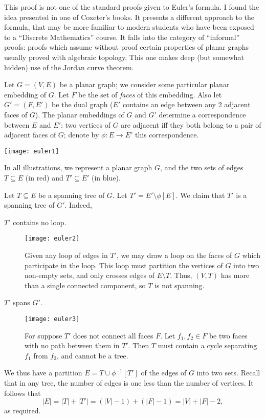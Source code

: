 \documentclass[12pt]{article}
\begin{document}
This proof is not one of the standard proofs given to Euler's formula.  I found the idea presented in one of Coxeter's books.  It presents a different approach to the formula, that may be more familiar to modern students who have been exposed to a ``Discrete Mathematics'' course.  It falls into the category of ``informal'' proofs: proofs which assume without proof certain properties of planar graphs usually proved with algebraic topology.  This one makes deep (but somewhat hidden) use of the Jordan curve theorem.

Let $G=(V,E)$ be a planar graph; we consider some particular planar embedding of $G$.  Let $F$ be the set of \emph{faces} of this embedding.  Also let $G'=(F,E')$ be the dual graph ($E'$ contains an edge between any 2 adjacent faces of $G$).  The planar embeddings of $G$ and $G'$ determine a correspondence between $E$ and $E'$: two vertices of $G$ are adjacent iff they both belong to a pair of adjacent faces of $G$; denote by $\phi:E\to E'$ this correspondence.

\begin{center}
\texttt{[image: euler1]}
\end{center}

\begin{small}
In all illustrations, we represent a planar graph $G$, and the two sets of edges $T\subseteq E$ (in red) and $T'\subseteq E'$ (in blue).
\end{small}

Let $T\subseteq E$ be a spanning tree of $G$.  Let $T' = E' \setminus \phi[E]$.  We claim that $T'$ is a spanning tree of $G'$.  Indeed,
\begin{description}
\item[$T'$ contains no loop.]
\begin{center}
\texttt{[image: euler2]}
\end{center}
Given any loop of edges in $T'$, we may draw a loop on the faces of $G$ which participate in the loop.  This loop must partition the vertices of $G$ into two non-empty sets, and only crosses edges of $E\setminus T$.  Thus, $(V,T)$ has more than a single connected component, so $T$ is not spanning.
\begin{small}
\end{small}

\item[$T'$ spans $G'$.]
\begin{center}
\texttt{[image: euler3]}
\end{center}
For suppose $T'$ does not connect all faces $F$.  Let $f_1,f_2\in F$ be two faces with no path between them in $T'$.  Then $T$ must contain a cycle separating $f_1$ from $f_2$, and cannot be a tree.
\begin{small}
\end{small}
\end{description}

We thus have a partition $E=T\cup \phi^{-1}[T']$ of the edges of $G$ into two sets.  Recall that in any tree, the number of edges is one less than the number of vertices.  It follows that 
\[
|E| = |T| + |T'| = (|V|-1) + (|F|-1) = |V|+|F|-2,
\]
as required.
\end{document}
